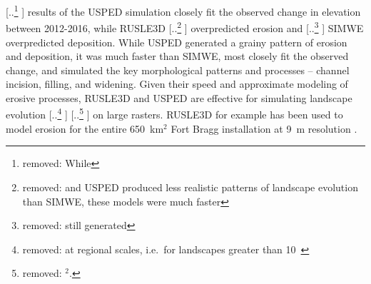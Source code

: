\documentclass[gmd, manuscript]{copernicus}
\providecommand{\DIFadd}[1]{{\protect\color{blue} \sf #1}} %
\providecommand{\DIFdel}[1]{{\protect\color{red} [..\footnote{removed: #1} ]}} %
\providecommand{\DIFaddbegin}{} %
\providecommand{\DIFaddend}{} %
\providecommand{\DIFdelbegin}{} %
\providecommand{\DIFdelend}{} %
\begin{document}
\DIFdel{While }\DIFdelend \DIFaddbegin \DIFadd{results of the USPED simulation closely fit
the observed change in elevation between 2012-2016,
while }\DIFaddend RUSLE3D \DIFdelbegin \DIFdel{and USPED produced less realistic patterns of landscape evolution
than SIMWE,
these models were much faster }\DIFdelend \DIFaddbegin \DIFadd{overpredicted erosion }\DIFaddend and 
\DIFdelbegin \DIFdel{still generated
}\DIFdelend \DIFaddbegin \DIFadd{SIMWE overpredicted deposition.
While USPED generated a grainy pattern of erosion and deposition,
it was much faster than SIMWE, most closely fit the observed change,
and simulated }\DIFaddend the key morphological patterns and processes -- 
channel incision, filling, and widening. 
Given their speed
and approximate modeling of erosive processes, 
RUSLE3D and USPED 
are effective for simulating landscape evolution
\DIFdelbegin \DIFdel{at regional scales, 
i.e.~for landscapes greater than 10~}%
\DIFdel{$^{2}$.
}\DIFdelend \DIFaddbegin \DIFadd{on large rasters.
}\DIFaddend RUSLE3D for example has been used to
model erosion for the entire 650~\unit{km}$^{2}$ 
Fort Bragg installation at 9~\unit{m} resolution
\citep{Levine2018}. 

\end{document}
